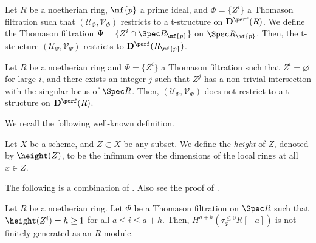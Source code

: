 \begin{citedlemma}\label{Lemma 6.2 Smith}
    Let $R$ be a noetherian ring, $\mf{p}$ a prime ideal, and $\Phi = \{Z^i\}$ a Thomason filtration such that $(\mathcal{U}_\Phi, \mathcal{V}_\Phi)$ restricts to a t-structure on $\mathbf{D}^{\perf}(R)$. We define the Thomason filtration $\Psi = \{Z^i \cap \Spec R_{\mf{p}}\}$ on $\Spec R_{\mf{p}}$. Then, the t-structure $(\mathcal{U}_\Psi, \mathcal{V}_\Psi)$ restricts to $\mathbf{D}^{\perf}(R_{\mf{p}})$.
\end{citedlemma}

\begin{citedlemma}    \label{Theorem 6.3 Smith}
    Let $R$ be a noetherian ring and $\Phi = \{Z^i\}$ a Thomason filtration such that $Z^i = \varnothing$ for large $i$, and there exists an integer $j$ such that $Z^j$ has a non-trivial intersection with the singular locus of $\Spec R$. Then, $(\mathcal{U}_{\Phi}, \mathcal{V}_{\Phi})$ does not restrict to a t-structure on $\mathbf{D}^{\perf}(R)$.
\end{citedlemma}
We recall the following well-known definition.
\begin{Def}
    Let $X$ be a scheme, and $Z\subset X$ be any subset. We define the \textit{height} of $Z$, denoted by $\height(Z)$, to be the infimum over the dimensions of the local rings at all $x\in Z$. 
\end{Def}
The following is a combination of \cite[Proposition 5.3 \& Corollary A.5]{smith2019bounded}. Also see the proof of \cite[Theorem 6.4]{smith2019bounded}.

\begin{Th}\label{Theorem 5.3 and A.5 Smith}
    Let $R$ be a noetherian ring. Let $\Phi$ be a Thomason filtration on $\Spec R$ such that $\height(Z^i) = h \geq 1$ for all $a \leq i \leq a+h$. Then, $H^{a+h}(\tau_\Phi^{\leq 0}R[-a])$ is not finitely generated as an $R$-module.
\end{Th}



